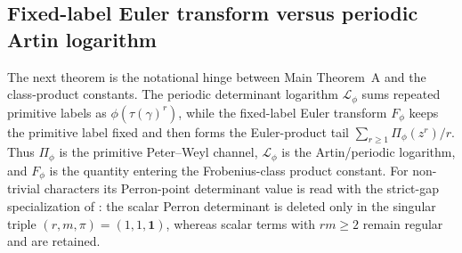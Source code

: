 \subsection{Fixed-label Euler transform versus periodic Artin logarithm}
\label{subsec:fixed-label-vs-artin-logarithm}

The next theorem is the notational hinge between Main Theorem~A and the
class-product constants.  The periodic determinant logarithm
\(\mathcal L_\phi\) sums repeated primitive labels as
\(\phi(\tau(\gamma)^r)\), while the fixed-label Euler transform
\(F_\phi\) keeps the primitive label fixed and then forms the Euler-product
tail \(\sum_{r\ge1}\Pi_\phi(z^r)/r\).  Thus \(\Pi_\phi\) is the primitive
Peter--Weyl channel, \(\mathcal L_\phi\) is the Artin/periodic logarithm,
and \(F_\phi\) is the quantity entering the Frobenius-class product
constant.  For non-trivial characters its Perron-point determinant value is
read with the strict-gap specialization of
: the scalar Perron
determinant is deleted only in the singular triple
\((r,m,\pi)=(1,1,\mathbf1)\), whereas scalar terms with \(rm\ge2\) remain
regular and are retained.

